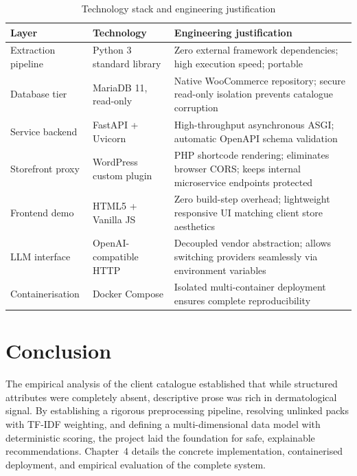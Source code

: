 \begin{table}[H]
\caption{Technology stack and engineering justification}
\label{tab:stack}
\centering
\begin{tabularx}{\textwidth}{L{2.8cm} L{3.2cm} X}
\toprule
\textbf{Layer} & \textbf{Technology} & \textbf{Engineering justification} \\
\midrule
Extraction pipeline & Python 3 standard library & Zero external framework dependencies; high execution speed; portable \\
Database tier & MariaDB 11, read-only & Native WooCommerce repository; secure read-only isolation prevents catalogue corruption \\
Service backend & FastAPI + Uvicorn & High-throughput asynchronous ASGI; automatic OpenAPI schema validation \\
Storefront proxy & WordPress custom plugin & PHP shortcode rendering; eliminates browser CORS; keeps internal microservice endpoints protected \\
Frontend demo & HTML5 + Vanilla JS & Zero build-step overhead; lightweight responsive UI matching client store aesthetics \\
LLM interface & OpenAI-compatible HTTP & Decoupled vendor abstraction; allows switching providers seamlessly via environment variables \\
Containerisation & Docker Compose & Isolated multi-container deployment ensures complete reproducibility \\
\bottomrule
\end{tabularx}
\end{table}

\section{Conclusion}

The empirical analysis of the client catalogue established that while structured attributes were completely absent, descriptive prose was rich in dermatological signal. By establishing a rigorous preprocessing pipeline, resolving unlinked packs with TF-IDF weighting, and defining a multi-dimensional data model with deterministic scoring, the project laid the foundation for safe, explainable recommendations. Chapter~4 details the concrete implementation, containerised deployment, and empirical evaluation of the complete system.

\clearpage
